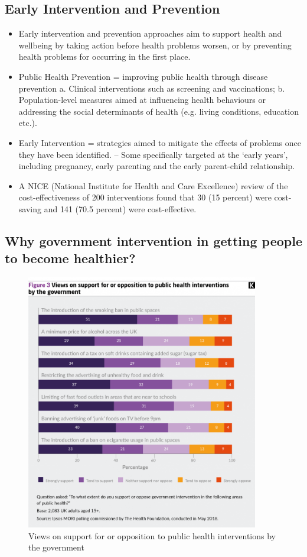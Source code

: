        \subsection{Early Intervention and Prevention}
\begin{itemize}           
        \item Early intervention and prevention approaches aim to support health and wellbeing by taking action before health problems worsen, or by preventing health problems for occurring in the first place. 
        \item Public Health Prevention = improving public health through disease prevention
        a. Clinical interventions such as screening and vaccinations;
        b. Population-level measures aimed at influencing health behaviours or
addressing the social determinants of health (e.g. living conditions, education etc.).
        \item Early Intervention = strategies aimed to mitigate the effects of problems once they have been identified.
        – Some specifically targeted at the ‘early years’, including pregnancy, early parenting and the early parent-child relationship.
        \item A NICE (National Institute for Health and Care Excellence) review of the cost-effectiveness of 200 interventions found that 30 (15 percent) were cost-saving and 141 (70.5 percent) were cost-effective.
        \end{itemize} 

\subsection{Why government intervention in getting people to become healthier?}
        \begin{figure}[H]%
                \centering
                \includegraphics[width=4in]{images/ch3/22.png}
                \caption{Views on support for or opposition to public health interventions by the government}
                \label{fig:label}
            \end{figure}

